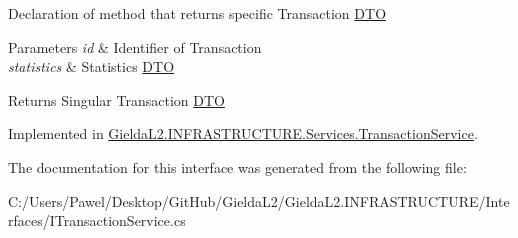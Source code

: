 Declaration of method that returns specific Transaction \mbox{\hyperlink{namespace_gielda_l2_1_1_i_n_f_r_a_s_t_r_u_c_t_u_r_e_1_1_d_t_o}{D\+TO}} 


\begin{DoxyParams}{Parameters}
{\em id} & Identifier of Transaction\\
\hline
{\em statistics} & Statistics \mbox{\hyperlink{namespace_gielda_l2_1_1_i_n_f_r_a_s_t_r_u_c_t_u_r_e_1_1_d_t_o}{D\+TO}}\\
\hline
\end{DoxyParams}
\begin{DoxyReturn}{Returns}
Singular Transaction \mbox{\hyperlink{namespace_gielda_l2_1_1_i_n_f_r_a_s_t_r_u_c_t_u_r_e_1_1_d_t_o}{D\+TO}}
\end{DoxyReturn}


Implemented in \mbox{\hyperlink{class_gielda_l2_1_1_i_n_f_r_a_s_t_r_u_c_t_u_r_e_1_1_services_1_1_transaction_service_a4f5d15410a05c95a970462c8d47a74db}{Gielda\+L2.\+I\+N\+F\+R\+A\+S\+T\+R\+U\+C\+T\+U\+R\+E.\+Services.\+Transaction\+Service}}.



The documentation for this interface was generated from the following file\+:\begin{DoxyCompactItemize}
\item 
C\+:/\+Users/\+Pawel/\+Desktop/\+Git\+Hub/\+Gielda\+L2/\+Gielda\+L2.\+I\+N\+F\+R\+A\+S\+T\+R\+U\+C\+T\+U\+R\+E/\+Interfaces/I\+Transaction\+Service.\+cs\end{DoxyCompactItemize}
